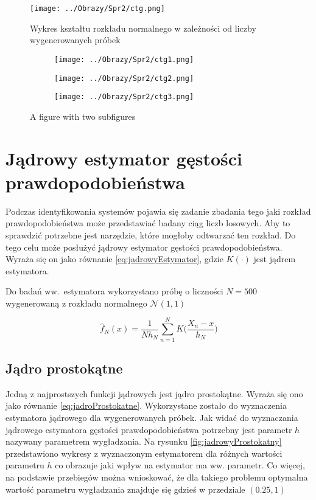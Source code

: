 \documentclass[12pt,a4paper]{article}
\begin{document}
\begin{figure}[H]
\centering
\texttt{[image: ../Obrazy/Spr2/ctg.png]} 
\caption{Wykres kształtu rozkładu normalnego w zależności od liczby wygenerowanych próbek}
\label{fig:ctg}
\end{figure}


\begin{figure}
\centering
\begin{subfigure}{.3\textwidth}
    \centering
   	\texttt{[image: ../Obrazy/Spr2/ctg1.png]} 
\end{subfigure}%
\begin{subfigure}{.3\textwidth}
  	\centering
	\texttt{[image: ../Obrazy/Spr2/ctg2.png]} 
\end{subfigure}
\begin{subfigure}{.3\textwidth}
  	\centering
	\texttt{[image: ../Obrazy/Spr2/ctg3.png]} 
\end{subfigure}
\caption{A figure with two subfigures}
\label{fig:test}
\end{figure}



\section{Jądrowy estymator gęstości prawdopodobieństwa}
Podczas identyfikowania systemów pojawia się zadanie zbadania tego jaki rozkład prawdopodobieństwa może przedstawiać badany ciąg liczb losowych. Aby to sprawdzić potrzebne jest narzędzie, które mogłoby odtwarzać ten rozkład.
Do tego celu może posłużyć jądrowy estymator gęstości prawdopodobieństwa.
Wyraża się on jako równanie \ref{eq:jadrowyEstymator}, gdzie $K(\cdot)$ jest jądrem estymatora.

Do badań ww.\ estymatora wykorzystano próbę o liczności $N=500$ wygenerowaną z rozkładu normalnego $\mathcal{N}(1,1)$ 

\begin{equation}\label{eq:jadrowyEstymator}
\hat{f}_{N}(x)=\frac{1}{Nh_{N}}\sum^{N}_{n=1}K\bigg(\frac{X_{n} - x}{h_{N}}\bigg)
\end{equation}

\subsection{Jądro prostokątne}
Jedną z najprostszych funkcji jądrowych jest jądro prostokątne. 
Wyraża się ono jako równanie \ref{eq:jadroProstokatne}.
Wykorzystane zostało do wyznaczenia estymatora jądrowego dla wygenerowanych próbek.
Jak widać do wyznaczania jądrowego estymatora gęstości prawdopodobieństwa potrzebny jest parametr $h$ nazywany parametrem wygładzania.
Na rysunku \ref{fig:jadrowyProstokatny} przedstawiono wykresy z wyznaczonym estymatorem dla różnych wartości parametru $h$ co obrazuje jaki wpływ na estymator ma ww. parametr.
Co więcej, na podstawie przebiegów można wnioskować, że dla takiego problemu optymalna wartość parametru wygładzania znajduje się gdzieś w przedziale $(0.25,1)$
\end{document}

